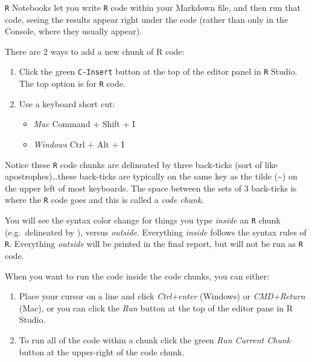 \documentclass[
]{book}
\providecommand{\tightlist}{%
  \setlength{\itemsep}{0pt}\setlength{\parskip}{0pt}}
\newenvironment{rmdnote}[1]
  {
  \begin{itemize}
  \renewcommand{\labelitemi}{
    \raisebox{-.7\height}[0pt][0pt]{
      {\setkeys{Gin}{width=3em,keepaspectratio}\texttt{[image: images/\#1]}}
    }
  }
  \setlength{\fboxsep}{1em}
  \begin{note}
  \item
  }
  {
  \end{note}
  \end{itemize}
  }
\begin{document}
\texttt{R} Notebooks let you write \texttt{R} code within your Markdown file, and then run that code, seeing the results appear right under the code (rather than only in the Console, where they usually appear).

There are 2 ways to add a new chunk of R code:

\begin{enumerate}
\def\labelenumi{\arabic{enumi}.}
\tightlist
\item
  Click the green \texttt{C-Insert} button at the top of the editor panel in \texttt{R} Studio. The top option is for \texttt{R} code.\\
\item
  Use a keyboard short cut:

  \begin{itemize}
  \tightlist
  \item
    \emph{Mac} Command + Shift + I
  \item
    \emph{Windows} Ctrl + Alt + I
  \end{itemize}
\end{enumerate}

Notice these \texttt{R} code chunks are delineated by three back-ticks (sort of like apostrophes)\ldots these back-ticks are typically on the same key as the tilde (\textasciitilde) on the upper left of most keyboards. The space between the sets of 3 back-ticks is where the \texttt{R} code goes and this is called a \emph{code chunk}.

\begin{rmdnote}{note}
You will see the syntax color change for things you type \emph{inside} an \texttt{R} chunk (e.g.~delineated by \texttt{\textasciigrave{}\textasciigrave{}\textasciigrave{}}), versus \emph{outside}. Everything \emph{inside} follows the syntax rules of \texttt{R}. Everything \emph{outside} will be printed in the final report, but will not be run as \texttt{R} code.

\end{rmdnote}

When you want to run the code inside the code chunks, you can either:

\begin{enumerate}
\def\labelenumi{\arabic{enumi}.}
\tightlist
\item
  Place your cursor on a line and click \emph{Ctrl+enter} (Windows) or \emph{CMD+Return} (Mac), or you can click the \emph{Run} button at the top of the editor pane in R Studio.
\item
  To run all of the code within a chunk click the green \emph{Run Current Chunk} button at the upper-right of the code chunk.
\end{enumerate}
\end{document}
